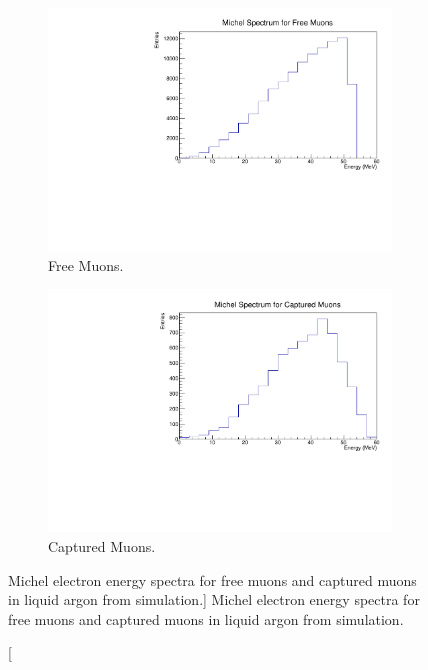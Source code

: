 \begin{figure}

	\centering
	\begin{subfigure}[b]{0.7\textwidth}
		\centering
		\includegraphics[width=\textwidth]{figures/michel_spec_free.pdf}
		\caption {Free Muons.}
		\label{fig:michel_spec_free}
	\end{subfigure}
	\begin{subfigure}[b]{0.7\textwidth}
		\centering
		\includegraphics[width=\textwidth]{figures/michel_spec_cap.pdf}
		\caption {Captured Muons.}
		\label{fig:michel_spec_cap}
	\end{subfigure}

	\caption
	[Michel electron energy spectra for free muons and captured muons in liquid 
	argon from \protodune{} simulation.]
	{Michel electron energy spectra for free muons and captured muons in liquid 
	argon from \protodune{} simulation.}
	\label{fig:michel_spec}

\end{figure}

